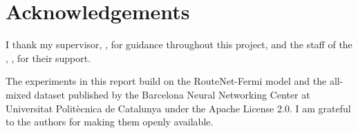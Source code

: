\chapter*{Acknowledgements}

I thank my supervisor, \supervisor{}, for guidance throughout this project, and the staff of the \department{}, \university{}, for their support.

The experiments in this report build on the RouteNet-Fermi model and the all-mixed dataset published by the Barcelona Neural Networking Center at Universitat Polit\`ecnica de Catalunya under the Apache License 2.0. I am grateful to the authors for making them openly available.
